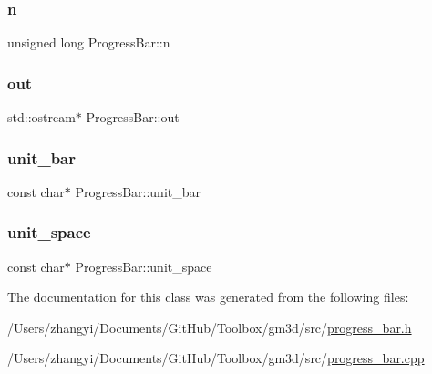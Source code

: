 \mbox{\label{class_progress_bar_a5eaa1945817db865bd2946886fed18d7}} 
\subsubsection{\texorpdfstring{n}{n}}
{\footnotesize\ttfamily unsigned long Progress\+Bar\+::n\hspace{0.3cm}{\ttfamily [private]}}

\mbox{\label{class_progress_bar_a037918f48f22bb6414ef2b8f277bb370}} 
\subsubsection{\texorpdfstring{out}{out}}
{\footnotesize\ttfamily std\+::ostream$\ast$ Progress\+Bar\+::out\hspace{0.3cm}{\ttfamily [private]}}

\mbox{\label{class_progress_bar_ac5fe04d7f2dee49bff858171911e866c}} 
\subsubsection{\texorpdfstring{unit\_bar}{unit\_bar}}
{\footnotesize\ttfamily const char$\ast$ Progress\+Bar\+::unit\+\_\+bar\hspace{0.3cm}{\ttfamily [private]}}

\mbox{\label{class_progress_bar_aa5c12a9e11e108c8ead079f3456e9631}} 
\subsubsection{\texorpdfstring{unit\_space}{unit\_space}}
{\footnotesize\ttfamily const char$\ast$ Progress\+Bar\+::unit\+\_\+space\hspace{0.3cm}{\ttfamily [private]}}



The documentation for this class was generated from the following files\+:\begin{DoxyCompactItemize}
\item 
/\+Users/zhangyi/\+Documents/\+Git\+Hub/\+Toolbox/gm3d/src/\mbox{\hyperlink{progress__bar_8h}{progress\+\_\+bar.\+h}}\item 
/\+Users/zhangyi/\+Documents/\+Git\+Hub/\+Toolbox/gm3d/src/\mbox{\hyperlink{progress__bar_8cpp}{progress\+\_\+bar.\+cpp}}\end{DoxyCompactItemize}
